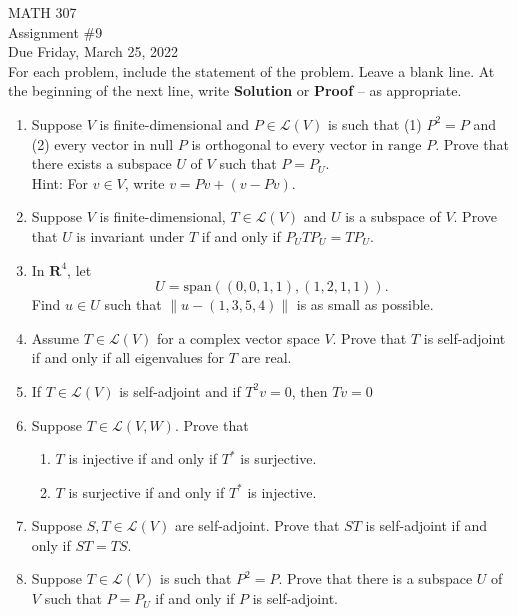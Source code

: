 \documentclass[12pt]{article}
\begin{document}
\noindent MATH 307 \\
Assignment \#9 \\ %
Due Friday, March 25, 2022 \\

For each problem, include the statement of the problem. Leave a blank line.  At the beginning of the next line, write \textbf{Solution} or \textbf{Proof} -- as appropriate.

\begin{enumerate}
\item Suppose $V$ is finite-dimensional and $P \in \mathcal{L}(V)$ is such that (1) $P^2 = P$ and (2) every vector in $\text{null } P$ is orthogonal to every vector in $\text{range }P$. Prove that there exists a subspace $U$ of $V$ such that $P = P_U$.\\
    Hint:  For $v \in V$, write $v = Pv + (v-Pv)$.

\item Suppose $V$ is finite-dimensional, $T \in \mathcal{L}(V)$ and $U$ is a subspace of $V$.  Prove that $U$ is invariant under $T$ if and only if $P_UTP_U = TP_U$.

\item In $\mathbf{R}^4$, let
    \[
        U = \text{span}\left((0,0,1,1) , (1,2,1,1) \right).
    \]
    Find $u \in U$ such that $\|u - (1,3,5,4) \|$ is as small as possible.
    
\item  Assume $T \in \mathcal{L}(V)$ for a complex vector space $V$.  Prove that $T$ is self-adjoint if and only if all eigenvalues for $T$ are real.

\item If $T \in \mathcal{L}(V)$ is self-adjoint and if $T^2v = 0$, then $Tv=0$

\item Suppose $T \in \mathcal{L}(V,W)$. Prove that
    \begin{enumerate}
    \item $T$ is injective if and only if $T^*$ is surjective.
    \item $T$ is surjective if and only if $T^*$ is injective.
    \end{enumerate}

\item Suppose $S,T \in \mathcal{L}(V)$ are self-adjoint.  Prove that $ST$ is self-adjoint if and only if $ST = TS$.

\item Suppose $T \in \mathcal{L}(V)$ is such that $P^2 = P$.  Prove that there is a subspace $U$ of $V$ such that $P = P_U$ if and only if $P$ is self-adjoint.

\end{enumerate}
\end{document}
